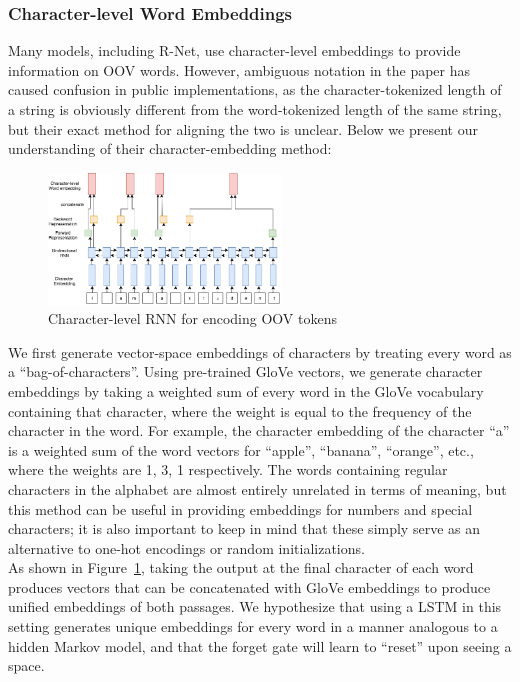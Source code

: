 \documentclass{article}
\begin{document}
\subsubsection{Character-level Word Embeddings}
Many models, including R-Net, use character-level embeddings to provide information on OOV words. However, ambiguous notation in the paper has caused confusion in public implementations, as the character-tokenized length of a string is obviously different from the word-tokenized length of the same string, but their exact method for aligning the two is unclear. Below we present our understanding of their character-embedding method:

\begin{figure}[h]
	\includegraphics[width=0.55\textwidth]{char_word2vec.png}
	\centering
	\caption{Character-level RNN for encoding OOV tokens}
	\label{fig:charRNN}
\end{figure}

We first generate vector-space embeddings of characters by treating every word as a ``bag-of-characters''. Using pre-trained GloVe vectors, we generate character embeddings by taking a weighted sum of every word in the GloVe vocabulary containing that character, where the weight is equal to the frequency of the character in the word. For example, the character embedding of the character ``a'' is a weighted sum of the word vectors for ``apple'', ``banana'', ``orange'', etc., where the weights are 1, 3, 1 respectively. The words containing regular characters in the alphabet are almost entirely unrelated in terms of meaning, but this method can be useful in providing embeddings for numbers and special characters; it is also important to keep in mind that these simply serve as an alternative to one-hot encodings or random initializations. \\

As shown in Figure~\ref{fig:charRNN}, taking the output at the final character of each word produces vectors that can be concatenated with GloVe embeddings to produce unified embeddings of both passages. We hypothesize that using a LSTM in this setting generates unique embeddings for every word in a manner analogous to a hidden Markov model, and that the forget gate will learn to ``reset'' upon seeing a space.
\end{document}
